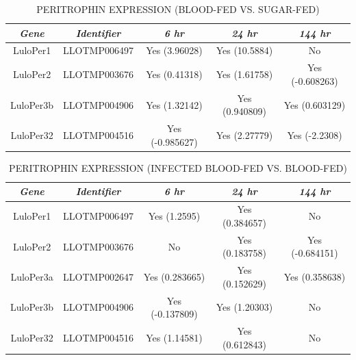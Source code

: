 \begin{table}[H]
  \begin{center}
    \small
  \caption{\label{tab:sandflies:stat-sig-peritrophins-sb} PERITROPHIN EXPRESSION (BLOOD-FED VS. SUGAR-FED)}
  \begin{tabular}{ c c c c c } \hline
    \emph{Gene} & \emph{Identifier} & \emph{6 hr} & \emph{24 hr} & \emph{144 hr} \\ \hline
    LuloPer1 & LLOTMP006497 & Yes (3.96028) & Yes (10.5884) & No \\
    LuloPer2 & LLOTMP003676 & Yes (0.41318) & Yes (1.61758) & Yes (-0.608263) \\
    LuloPer3b & LLOTMP004906 & Yes (1.32142) & Yes (0.940809) & Yes (0.603129) \\
    LuloPer32 & LLOTMP004516 & Yes (-0.985627) & Yes (2.27779) & Yes (-2.2308)
  \end{tabular}
  \end{center}
\end{table}

\begin{table}[H]
  \begin{center}
    \small
  \caption{\label{tab:sandflies:stat-sig-peritrophins-bi} PERITROPHIN EXPRESSION (INFECTED BLOOD-FED VS. BLOOD-FED)}
  \begin{tabular}{ c c c c c } \hline
    \emph{Gene} & \emph{Identifier} & \emph{6 hr} & \emph{24 hr} & \emph{144 hr} \\ \hline
    LuloPer1 & LLOTMP006497 & Yes (1.2595) & Yes (0.384657) & No \\
    LuloPer2 & LLOTMP003676 & No & Yes (0.183758) & Yes (-0.684151) \\
    LuloPer3a & LLOTMP002647 & Yes (0.283665) & Yes (0.152629) & Yes (0.358638) \\
    LuloPer3b & LLOTMP004906 & Yes (-0.137809) & Yes (1.20303) & No \\
    LuloPer32 & LLOTMP004516 & Yes (1.14581) & Yes (0.612843) & No
  \end{tabular}
  \end{center}
\end{table}

